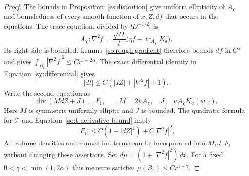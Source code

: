 \begin{proof}
The bounds in Proposition~\ref{es:distortion} give uniform ellipticity
of $A_\chi$ and boundedness of every smooth function of $x,Z,df$ that
occurs in the equations.  The trace equation, divided by
$lD^{-1/2}$, is
\begin{equation}\label{so:normalized-trace}
 A_\chi:\nabla^2 f
       =\frac{\sqrt D}{l}\bigl(\eta f-
                                  \operatorname{tr}_{A_\chi}K_a\bigr).
\end{equation}
Its right side is bounded.  Lemma~\ref{so:rough-gradient} therefore
bounds $df$ in $C^\alpha$ and gives
$\int_{B_r}|\nabla^2f|^2\le Cr^{1+2\alpha}$.
The exact differential identity in Equation~\ref{sy:differential}
gives
\begin{equation}\label{so:t-derivative-bound}
 |dt|\le C(|dZ|+|\nabla^2 f|+1).
\end{equation}
Write the second equation as
\[
 \operatorname{div}(M dZ+J)=F_1,\qquad
 M=2uA_\chi,\quad J=uA_\chi K_a(w,\cdot).
\]
Here $M$ is symmetric uniformly elliptic and $J$ is bounded.  The
quadratic formula for $\mathcal T$ and
Equation~\ref{so:t-derivative-bound} imply
\begin{equation}\label{so:natural-growth}
 |F_1|\le C(1+|dZ|^2)+C|\nabla^2f|^2.
\end{equation}
All volume densities and connection terms can be incorporated into
$M,J,F_1$ without changing these assertions.  Set
$d\mu=(1+|\nabla^2f|^2)\,dx$.  For a fixed
$0<\gamma<\min(1,2\alpha)$ this measure satisfies
$\mu(B_r)\le Cr^{1+\gamma}$.


\end{proof}
